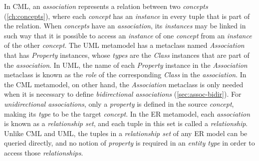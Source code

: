 \begin{definition}
In CML,
an \emph{association} represents a relation between two \emph{concepts} (\ref{ch:concepts}),
where each \emph{concept} has an \emph{instance} in every tuple that is part of the relation.
When \emph{concepts} have an \emph{association},
its \emph{instances} may be linked in such way that
it is possible to access an \emph{instance} of one \emph{concept}
from an \emph{instance} of the other \emph{concept}.
The UML \cite{uml} metamodel has a metaclass named \emph{Association} that has \emph{Property} instances,
whose \emph{types} are the \emph{Class} instances that are part of the \emph{association}.
In UML, the name of each \emph{Property} instance in the \emph{Association} metaclass
is known as the \emph{role} of the corresponding \emph{Class} in the \emph{association}.
In the CML metamodel, on other hand,
the \emph{Association} metaclass is only needed
when it is necessary to define \emph{bidirectional associations} (\ref{sec:assoc-bidir}).
For \emph{unidirectional associations},
only a \emph{property} is defined in the source \emph{concept},
making its \emph{type} to be the target \emph{concept}.
In the ER \cite{er} metamodel,
each \emph{association} is known as a \emph{relationship set},
and each tuple in this set is called a \emph{relationship}.
Unlike CML and UML,
the tuples in a \emph{relationship set} of any ER model
can be queried directly,
and no notion of \emph{property} is required in an \emph{entity type}
in order to access those \emph{relationships}.
\end{definition}
